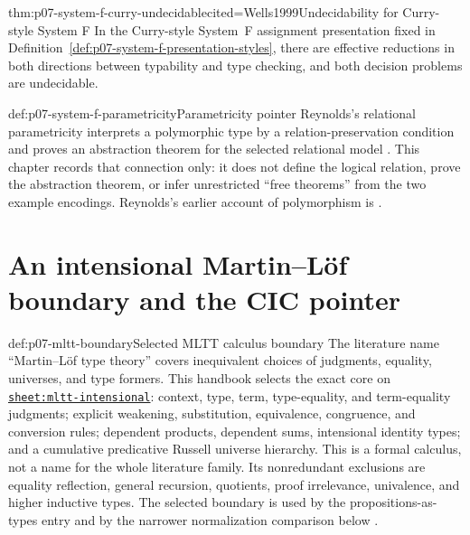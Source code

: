 \begin{hbtheorem}{thm:p07-system-f-curry-undecidable}{cited=Wells1999}{Undecidability for Curry-style System F}
In the Curry-style System~F assignment presentation fixed in
Definition~\ref{def:p07-system-f-presentation-styles}, there are effective
reductions in both directions between typability and type checking, and both
decision problems are undecidable.
\end{hbtheorem}

\begin{proofboundary}{def:p07-system-f-parametricity}{Parametricity pointer}
Reynolds's relational parametricity interprets a polymorphic type by a
relation-preservation condition and proves an abstraction theorem for the
selected relational model \cite{Reynolds1983}.  This chapter records that
connection only: it does not define the logical relation, prove the
abstraction theorem, or infer unrestricted ``free theorems'' from the two
example encodings.  Reynolds's earlier account of polymorphism is
\cite{Reynolds1974}.
\end{proofboundary}

\section[Intensional type theory]{An intensional Martin--L\"of boundary and the CIC pointer}

\begin{proofboundary}{def:p07-mltt-boundary}{Selected MLTT calculus boundary}
The literature name ``Martin--L\"of type theory'' covers inequivalent choices
of judgments, equality, universes, and type formers. This handbook selects the
exact core on \hyperref[sheet:mltt-intensional]{\texttt{sheet:mltt-intensional}}:
context, type, term, type-equality, and term-equality judgments; explicit
weakening, substitution, equivalence, congruence, and conversion rules;
dependent products, dependent sums, intensional identity types; and a
cumulative predicative Russell universe hierarchy. This is a formal calculus,
not a name for the whole literature family. Its nonredundant exclusions are
equality reflection, general recursion, quotients, proof irrelevance,
univalence, and higher inductive types. The selected boundary is used by the
propositions-as-types entry and by the narrower normalization comparison below
\cite{MartinLof1984,NordstromPeterssonSmith1990,Hofmann1997}.
\end{proofboundary}

